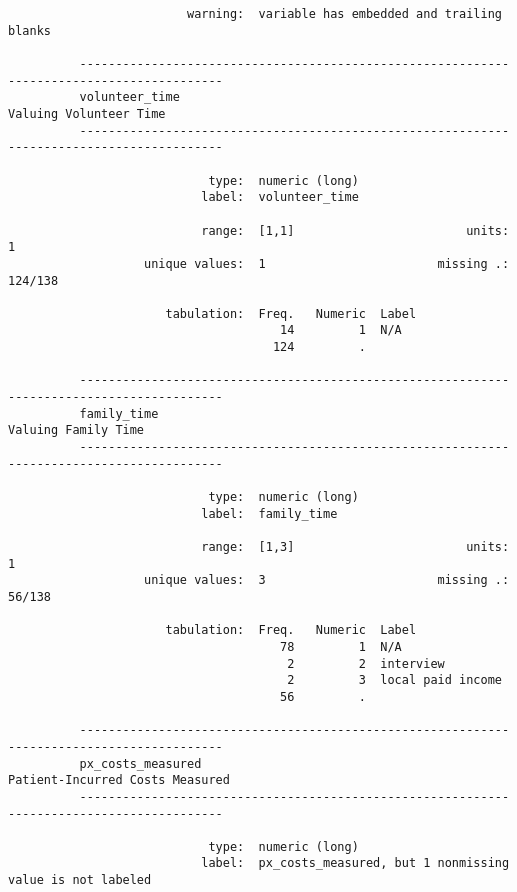 \documentclass{article}
\begin{document}
\begin{verbatim}
                         warning:  variable has embedded and trailing blanks
          
          ------------------------------------------------------------------------------------------
          volunteer_time                                                      Valuing Volunteer Time
          ------------------------------------------------------------------------------------------
          
                            type:  numeric (long)
                           label:  volunteer_time
          
                           range:  [1,1]                        units:  1
                   unique values:  1                        missing .:  124/138
          
                      tabulation:  Freq.   Numeric  Label
                                      14         1  N/A
                                     124         .  
          
          ------------------------------------------------------------------------------------------
          family_time                                                            Valuing Family Time
          ------------------------------------------------------------------------------------------
          
                            type:  numeric (long)
                           label:  family_time
          
                           range:  [1,3]                        units:  1
                   unique values:  3                        missing .:  56/138
          
                      tabulation:  Freq.   Numeric  Label
                                      78         1  N/A
                                       2         2  interview
                                       2         3  local paid income
                                      56         .  
          
          ------------------------------------------------------------------------------------------
          px_costs_measured                                          Patient-Incurred Costs Measured
          ------------------------------------------------------------------------------------------
          
                            type:  numeric (long)
                           label:  px_costs_measured, but 1 nonmissing value is not labeled
          

\end{verbatim}
\end{document}
